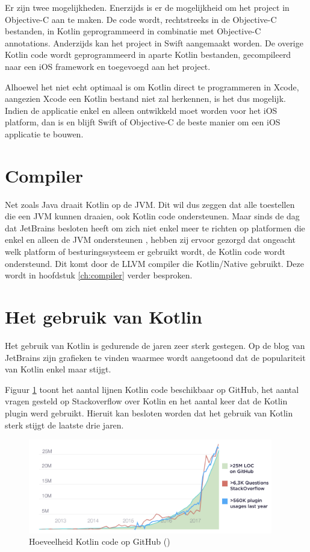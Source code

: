 Er zijn twee mogelijkheden. Enerzijds is er de mogelijkheid om het project in Objective-C aan te maken. De code wordt, rechtstreeks in de Objective-C bestanden, in Kotlin geprogrammeerd in combinatie met Objective-C annotations. Anderzijds kan het project in Swift aangemaakt worden. De overige Kotlin code wordt geprogrammeerd in aparte Kotlin bestanden, gecompileerd naar een iOS framework en toegevoegd aan het project.

Alhoewel het niet echt optimaal is om Kotlin direct te programmeren in Xcode, aangezien Xcode een Kotlin bestand niet zal herkennen, is het dus mogelijk. Indien de applicatie enkel en alleen ontwikkeld moet worden voor het iOS platform, dan is en blijft Swift of Objective-C de beste manier om een iOS applicatie te bouwen.

\section{Compiler}
\label{sec:llvm}
Net zoals Java draait Kotlin op de JVM. Dit wil dus zeggen dat alle toestellen die een JVM kunnen draaien, ook Kotlin code ondersteunen. Maar sinds de dag dat JetBrains besloten heeft om zich niet enkel meer te richten op platformen die enkel en alleen de JVM ondersteunen \autocite{JetBrainsVM}, hebben zij ervoor gezorgd dat ongeacht welk platform of besturingssysteem er gebruikt wordt, de Kotlin code wordt ondersteund. Dit komt door de LLVM compiler die Kotlin/Native gebruikt. Deze wordt in hoofdstuk \ref{ch:compiler} verder besproken.

\section{Het gebruik van Kotlin}
\label{sec:kotlingebruik}
Het gebruik van Kotlin is gedurende de jaren zeer sterk gestegen. Op de blog van JetBrains \autocite{JetBrains12} zijn grafieken te vinden waarmee wordt aangetoond dat de populariteit van Kotlin enkel maar stijgt.

Figuur \ref{fig:kotlingithub} toont het aantal lijnen Kotlin code beschikbaar op GitHub, het aantal vragen gesteld op Stackoverflow over Kotlin en het aantal keer dat de Kotlin plugin werd gebruikt. Hieruit kan besloten worden dat het gebruik van Kotlin sterk stijgt de laatste drie jaren.

\begin{figure} [ht]
	\centering
	\includegraphics[width=0.95\textwidth]{img/KotlinAdoption.png}
	\caption{Hoeveelheid Kotlin code op GitHub (\cite{JetBrains12})}
	\label{fig:kotlingithub}
\end{figure}

